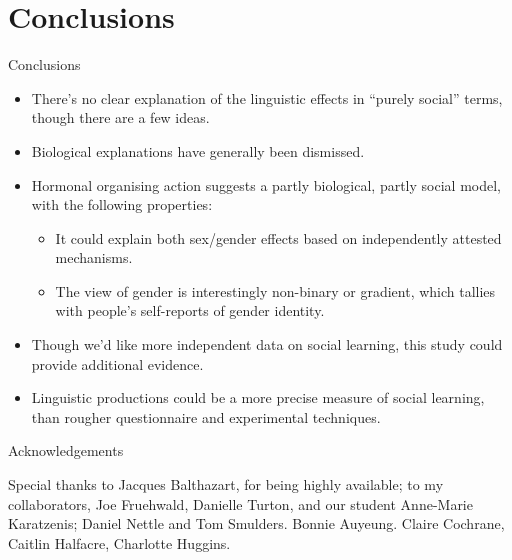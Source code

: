 \documentclass[hyperref={pdfpagelabels=false}]{beamer}
\begin{document}



\section{Conclusions}


\begin{frame}{Conclusions}
		\begin{itemize}
			\item There's no clear explanation of the linguistic effects in ``purely social'' terms, though there are a few ideas.
			\item Biological explanations have generally been dismissed.
			\item Hormonal organising action suggests a partly biological, partly social model, with the following properties:
		\begin{itemize}
			\item It could explain both sex/gender effects based on independently attested mechanisms.
			\item The view of gender is interestingly non-binary or gradient, which tallies with people's self-reports of gender identity.
			\end{itemize}
			\item Though we'd like more independent data on social learning, this study could provide additional evidence.
			\item Linguistic productions could be a more precise measure of social learning, than rougher questionnaire and experimental techniques.
		
	\end{itemize}
\end{frame}




\begin{frame}{Acknowledgements}
\begin{center}

Special thanks to Jacques Balthazart, for being highly available; to my collaborators, Joe Fruehwald, Danielle Turton, and our student Anne-Marie Karatzenis; Daniel Nettle and Tom Smulders. Bonnie Auyeung. Claire Cochrane, Caitlin Halfacre, Charlotte Huggins.

\end{center}
\end{frame}
\end{document}
